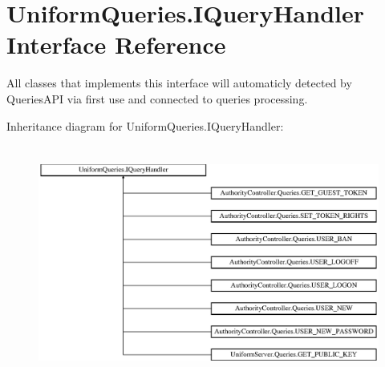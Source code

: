 \hypertarget{interface_uniform_queries_1_1_i_query_handler}{}\section{Uniform\+Queries.\+I\+Query\+Handler Interface Reference}
\label{interface_uniform_queries_1_1_i_query_handler}


All classes that implements this interface will automaticly detected by Queries\+A\+PI via first use and connected to queries processing.  


Inheritance diagram for Uniform\+Queries.\+I\+Query\+Handler\+:\begin{figure}[H]
\begin{center}
\leavevmode
\includegraphics[height=7.753846cm]{da/d51/interface_uniform_queries_1_1_i_query_handler}
\end{center}
\end{figure}
